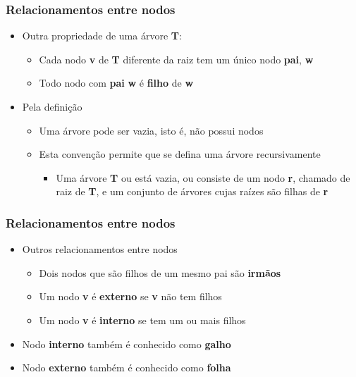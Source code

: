 \documentclass[aspectratio=169]{beamer}
\begin{document}
\begin{frame}\frametitle{Relacionamentos entre nodos	}
\begin{itemize}
	\item Outra propriedade de uma árvore \textbf{T}:
	\begin{itemize}
		\item Cada nodo \textbf{v} de \textbf{T} diferente da raiz tem um único nodo \textbf{pai}, \textbf{w}
		\item Todo nodo com \textbf{pai} \textbf{w} é \textbf{filho} de \textbf{w}
	\end{itemize}
	\item Pela definição
	\begin{itemize}
		\item Uma árvore pode ser vazia, isto é, não possui nodos
		\item Esta convenção permite que se defina uma árvore recursivamente
		\begin{itemize}
			\item Uma árvore \textbf{T} ou está vazia, ou consiste de um nodo \textbf{r}, chamado de raiz de \textbf{T}, e um conjunto de árvores cujas raízes são filhas de \textbf{r}
		\end{itemize}
	\end{itemize}
\end{itemize}
\end{frame}
	
\begin{frame}\frametitle{Relacionamentos entre nodos}
\begin{itemize}
	\item Outros relacionamentos entre nodos
	\begin{itemize}
		\item Dois nodos que são filhos de um mesmo pai são \textbf{irmãos}
		\item Um nodo \textbf{v} é \textbf{externo} se \textbf{v} não tem filhos
		\item Um nodo \textbf{v} é \textbf{interno} se tem um ou mais filhos
	\end{itemize}
	\item Nodo \textbf{interno} também é conhecido como \textbf{galho}
	\item Nodo \textbf{externo} também é conhecido como \textbf{folha}
\end{itemize}
\end{frame}
\end{document}
